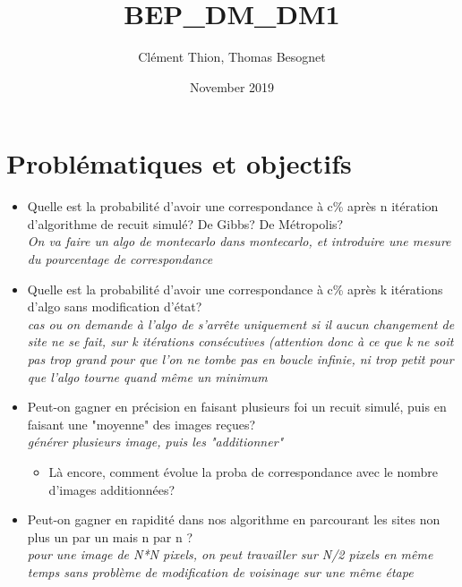 \documentclass[fleqn]{article} %
\title{BEP\_DM\_DM1}
\author{Clément Thion, Thomas Besognet}
\date{November 2019}
\begin{document}
\maketitle

\section{Problématiques et objectifs}

\begin{itemize}
	\item Quelle est la probabilité d'avoir une correspondance à c\% après n itération d'algorithme de recuit simulé? De Gibbs? De Métropolis? \\
		\textit{On va faire un algo de montecarlo dans montecarlo, et introduire une mesure du pourcentage de correspondance}
	\item Quelle est la probabilité d'avoir une correspondance à c\% après k itérations d'algo sans modification d'état?\\
		\textit{cas ou on demande à l'algo de s'arrête uniquement si il aucun changement de site ne se fait, sur k itérations consécutives (attention donc à ce que k ne soit pas trop grand pour que l'on ne tombe pas en boucle infinie, ni trop petit pour que l'algo tourne quand même un minimum}
	\item Peut-on gagner en précision en faisant plusieurs foi un recuit simulé, puis en faisant une "moyenne" des images reçues?\\
		\textit{générer plusieurs image, puis les "additionner"}\\
		\begin{itemize} \item Là encore, comment évolue la proba de correspondance avec le nombre d'images additionnées?	\end{itemize}
	\item Peut-on gagner en rapidité dans nos algorithme en parcourant les sites non plus un par un mais n par n ?\\
		\textit{pour une image de N*N pixels, on peut travailler sur N/2 pixels en même temps sans problème de modification de voisinage sur une même étape}
\end{itemize}
\end{document}
